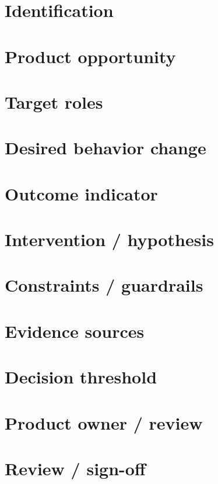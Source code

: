 \documentclass[11pt,letterpaper]{article}
\begin{document}
\section{Identification}
\section{Product opportunity}
\section{Target roles}
\section{Desired behavior change}
\section{Outcome indicator}
\section{Intervention / hypothesis}
\clearpage
\section{Constraints / guardrails}
\section{Evidence sources}
\section{Decision threshold}
\section{Product owner / review}
\clearpage
\section{Review / sign-off}
\end{document}
